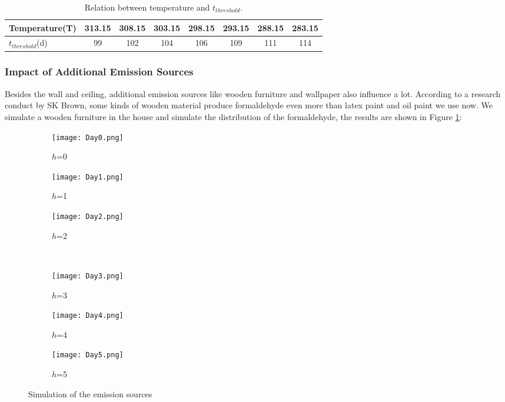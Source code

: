 \documentclass{mcmthesis}
\begin{document}
\begin{table}[H]
  \begin{center}
    \caption{Relation between temperature and $t_{threshold}$.}
    \label{tab:RbT}
    \begin{tabular}{lccccccc}
      	\toprule
      	Temperature(T) & 313.15 & 308.15 & 303.15 & 298.15 & 293.15 & 288.15 & 283.15\\
      	\midrule
        $t_{threshold}$(d) & 99 & 102 & 104 & 106 & 109 & 111 & 114\\
      	\bottomrule
    \end{tabular}
  \end{center}
\end{table}


\subsubsection{Impact of Additional Emission Sources}

Besides the wall and ceiling, additional emission sources like wooden furniture and wallpaper also influence a lot. According to a research \cite{brown1999chamber} conduct by SK Brown, some kinds of wooden material produce formaldehyde even more than latex paint and oil paint we use now. We simulate a wooden furniture in the house and simulate the distribution of the formaldehyde, the results are shown in Figure \ref{fig:sources}:

\begin{figure}[H]
  \centering
  \begin{subfigure}[b]{0.3\linewidth}
    \texttt{[image: Day0.png]}
    \caption{$h$=0}
  \end{subfigure}
  \begin{subfigure}[b]{0.3\linewidth}
    \texttt{[image: Day1.png]}
    \caption{$h$=1}
  \end{subfigure}
  \begin{subfigure}[b]{0.3\linewidth}
    \texttt{[image: Day2.png]}
    \caption{$h$=2}
  \end{subfigure}\\
  \begin{subfigure}[b]{0.3\linewidth}
    \texttt{[image: Day3.png]}
    \caption{$h$=3}
  \end{subfigure}
  \begin{subfigure}[b]{0.3\linewidth}
    \texttt{[image: Day4.png]}
    \caption{$h$=4}
  \end{subfigure}
  \begin{subfigure}[b]{0.3\linewidth}
    \texttt{[image: Day5.png]}
    \caption{$h$=5}
  \end{subfigure}
  \caption{Simulation of the emission sources}
  \label{fig:sources}
\end{figure}
\end{document}

